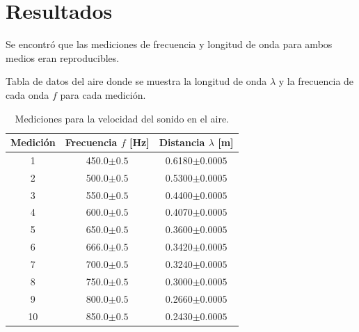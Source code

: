 \documentclass[10pt,a4paper]{article}
\begin{document}
\section{Resultados}
Se encontró que las mediciones de frecuencia y longitud de onda para ambos medios eran reproducibles. 

Tabla de datos del aire donde se muestra la longitud de onda $\lambda$ y la frecuencia de cada onda $f$ para cada medición.
\begin{table}[H]
  \centering
    \begin{tabular}{|c|c|c|} \hline
    Medición & Frecuencia $f$ [Hz] & Distancia $\lambda$ [m] \\ \hline
    1     & 450.0$\pm 0.5$ & 0.6180$\pm 0.0005$ \\ \hline
    2     & 500.0$\pm 0.5$ & 0.5300$\pm 0.0005$ \\ \hline
    3     & 550.0$\pm 0.5$ & 0.4400$\pm 0.0005$ \\ \hline
    4     & 600.0$\pm 0.5$ & 0.4070$\pm 0.0005$ \\ \hline
    5     & 650.0$\pm 0.5$ & 0.3600$\pm 0.0005$ \\ \hline
    6     & 666.0$\pm 0.5$ & 0.3420$\pm 0.0005$ \\ \hline
    7     & 700.0$\pm 0.5$ & 0.3240$\pm 0.0005$ \\ \hline
    8     & 750.0$\pm 0.5$ & 0.3000$\pm 0.0005$ \\ \hline
    9     & 800.0$\pm 0.5$ & 0.2660$\pm 0.0005$ \\ \hline
    10    & 850.0$\pm 0.5$ & 0.2430$\pm 0.0005$ \\ \hline
    \end{tabular}%
  \caption{Mediciones para la velocidad del sonido en el aire.}
\end{table}%
\end{document}
